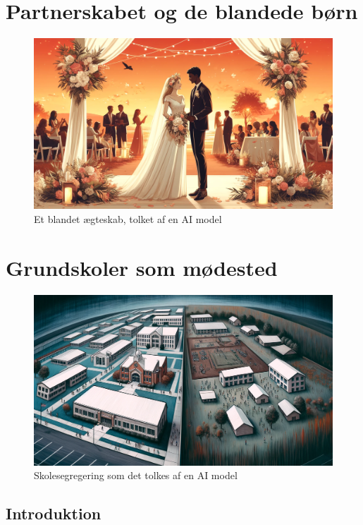 \documentclass[
]{book}
\begin{document}
\hypertarget{kap2}{%
\chapter{Partnerskabet og de blandede børn}\label{kap2}}

\begin{figure}
\includegraphics[width=24.89in]{images/dalle-wedding} \caption{Et blandet ægteskab, tolket af en AI model}\label{fig:fig-partner}
\end{figure}

\hypertarget{kap3}{%
\chapter{Grundskoler som mødested}\label{kap3}}

\begin{figure}
\includegraphics[width=24.89in]{images/dalle-schoolseg} \caption{Skolesegregering som det tolkes af en AI model}\label{fig:fig-schoolseg}
\end{figure}

\hypertarget{introduktion}{%
\section{Introduktion}\label{introduktion}}
\end{document}
